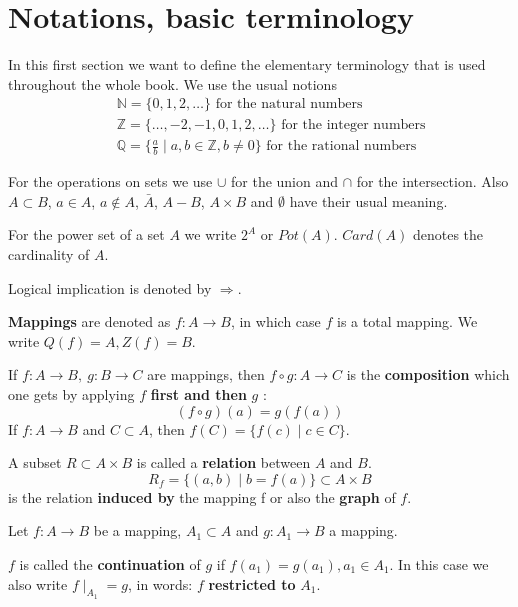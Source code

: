 \section{Notations, basic terminology}

In this first section we want to define the elementary terminology that is
used throughout the whole book. We use the usual notions
\begin{eqnarray*}
& & \mathbb{N} = \{ 0, 1, 2, \ldots \}\mbox{ for the natural numbers} \\
& & \mathbb{Z} = \{ \ldots, -2, -1, 0, 1, 2, \ldots \}\mbox{ for the integer
numbers} \\
& & \mathbb{Q} = \{ \frac{a}{b} \mid a,b \in \mathbb{Z}, b \neq 0 \}\mbox{ for
the rational numbers}
\end{eqnarray*}

For the operations on sets we use $\cup$ for the union and $\cap$ for the
intersection. Also $A \subset B$, $a \in A$, $a \not\in A$, $\bar{A}$, $A - B$,
$A \times B$ and $\emptyset$ have their usual meaning.

For the power set of a set $A$ we write $2^A$ or $Pot(A)$. $Card(A)$ denotes the
cardinality of $A$.

Logical implication is denoted by $\Rightarrow$.

{\bf Mappings} are denoted as $f : A \rightarrow B$, in which case $f$ is a
total mapping. We write $Q(f) = A, Z(f) = B$. 


If $f: A \rightarrow B,\ g : B \rightarrow C$ are mappings, then $f \circ g : A
\rightarrow C$ is the {\bf composition} which one gets by applying
\boldmath $f$ {\bf first and then} $g$ \unboldmath: 
\[(f \circ g)(a) = g(f(a))\]
If $f:A \rightarrow B$ and $C \subset A$, then $f(C) = \{ f(c) \mid c \in C \}$.


A subset $R \subset A \times B$ is called a {\bf relation} between $A$ and $B$.
\[R_f = \{ (a,b) \mid b = f(a) \} \subset A \times B\] 
is the relation {\bf induced by} the mapping f or also the {\bf graph} of $f$.

Let $f : A \rightarrow B$ be a mapping, $A_1 \subset A$ and $g : A_1 \rightarrow
B$ a mapping. 

$f$ is called the {\bf continuation} of $g$ if $f(a_1) = g(a_1),
a_1 \in A_1$. In this case we also write $f \mid _{A_1} = g$, in words: $f$
{\bf restricted to} $A_1$.

